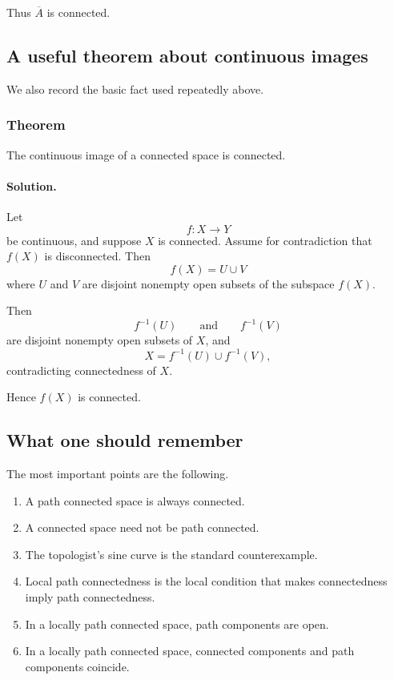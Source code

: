 \documentclass[12pt,a4paper]{article}
\theoremstyle{notespace}
\begin{document}
Thus \(\overline{A}\) is connected.

\subsection{A useful theorem about continuous images}

We also record the basic fact used repeatedly above.

\subsubsection{Theorem}

The continuous image of a connected space is connected.

\paragraph{\textbf{Solution.}}
Let
\[
f:X\to Y
\]
be continuous, and suppose \(X\) is connected. Assume for contradiction that \(f(X)\) is disconnected. Then
\[
f(X)=U\cup V
\]
where \(U\) and \(V\) are disjoint nonempty open subsets of the subspace \(f(X)\).

Then
\[
f^{-1}(U)
\qquad\text{and}\qquad
f^{-1}(V)
\]
are disjoint nonempty open subsets of \(X\), and
\[
X=f^{-1}(U)\cup f^{-1}(V),
\]
contradicting connectedness of \(X\).

Hence \(f(X)\) is connected.

\subsection{What one should remember}

The most important points are the following.

\begin{enumerate}
	\item A path connected space is always connected.
	\item A connected space need not be path connected.
	\item The topologist's sine curve is the standard counterexample.
	\item Local path connectedness is the local condition that makes connectedness imply path connectedness.
	\item In a locally path connected space, path components are open.
	\item In a locally path connected space, connected components and path components coincide.
\end{enumerate}
\end{document}
